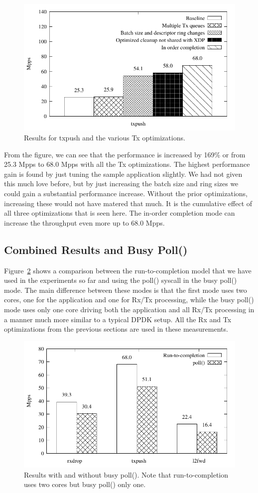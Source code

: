 \documentclass[9pt,numbers,reprint]{sigplanconf}
\begin{document}
\begin{figure}[ht]
\centering
\includegraphics[width=.5\textwidth]{results_tx.pdf}
\caption{Results for txpush and the various Tx optimizations.}
\label{fig:results_tx}
\end{figure}

From the figure, we can see that the performance is increased by 169\%
or from 25.3 Mpps to 68.0 Mpps with all the Tx optimizations. The highest
performance gain is found by just tuning the sample application
slightly. We had not given this much love before, but by just
increasing the batch size and ring sizes we could gain a substantial
performance increase. Without the prior optimizations, increasing
these would not have matered that much. It is the cumulative effect of all
three optimizations that is seen here. The in-order completion mode
can increase the throughput even more up to 68.0 Mpps.


\subsection{Combined Results and Busy Poll()}
\label{sec:exp:combres}

Figure~\ref{fig:results_poll} shows a comparison between the
run-to-completion model that we have used in the experiments so far
and using the poll() syscall in the busy poll() mode. The main
difference between these modes is that the first mode uses two cores,
one for the application and one for Rx/Tx processing, while the busy
poll() mode uses only one core driving both the application and all
Rx/Tx processing in a manner much more similar to a typical DPDK
setup. All the Rx and Tx optimizations from the previous sections are
used in these measurements.

\begin{figure}[ht]
\centering
\includegraphics[width=.5\textwidth]{results_poll.pdf}
\caption{Results with and without busy poll(). Note that
  run-to-completion uses two cores but busy poll() only one.}
\label{fig:results_poll}
\end{figure}
\end{document}
